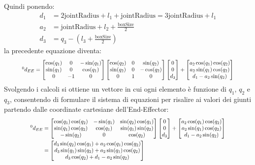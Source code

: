 \documentclass[11pt, a4paper]{report}
\begin{document}
Quindi ponendo:
\begin{align*}
    d_{1} &= 2\text{jointRadius} + l_{1} + \text{jointRadius} = 3\text{jointRadius} + l_{1} \\
    a_{2} &= \text{jointRadius} + l_{2} + \frac{\text{boxSize}}{2} \\
    d_{3} &= q_{3} - \left(l_{3} + \frac{\text{boxSize}}{2}\right)
\end{align*}
la precedente equazione diventa:
\[
\scalebox{0.8}{$
{}^{0}d_{EE} =
\begin{bmatrix}
    \cos(q_1) & 0 & -\sin(q_1) \\
    \sin(q_1) & 0 & \cos(q_1) \\
    0 & -1 & 0
\end{bmatrix}
\begin{bmatrix}
    \cos(q_2) & 0 & \sin(q_2) \\
    \sin(q_2) & 0 & -\cos(q_2) \\
    0 & 1 & 0
\end{bmatrix}
\begin{bmatrix}
    0\\
    0\\
    d_{3}
\end{bmatrix}
+
\begin{bmatrix}
   a_{2}\cos(q_1)\cos(q_2) \\
   a_{2}\sin(q_1)\cos(q_2) \\
    d_{1} - a_{2}\sin(q_2)
\end{bmatrix}
$}
\]
Svolgendo i calcoli si ottiene un vettore in cui ogni elemento è funzione di $q_1$, $q_2$ e $q_3$, consentendo di formulare il sistema di equazioni per risalire ai valori dei giunti partendo dalle coordinate cartesiane dell'End-Effector:
\[
\scalebox{0.8}{$
\begin{aligned}
    {}^{0}d_{EE} & =
    \begin{bmatrix}
        \cos(q_1)\cos(q_2) & -\sin(q_1) & \sin(q_2)\cos(q_1) \\
        \sin(q_1)\cos(q_2) & \cos(q_1) & \sin(q_1)\sin(q_2) \\
        -\sin(q_2) & 0 & \cos(q_2)
    \end{bmatrix}
    \begin{bmatrix}
        0\\
        0\\
        d_{3}
    \end{bmatrix}
    +
    \begin{bmatrix}
    a_{2}\cos(q_1)\cos(q_2) \\
    a_{2}\sin(q_1)\cos(q_2) \\
    d_{1} - a_{2}\sin(q_2)
    \end{bmatrix}\\
    &=
    \begin{bmatrix}
    d_3 \sin(q_2) \cos(q_1) + a_2 \cos(q_1) \cos(q_2)\\
    d_3 \sin(q_1) \sin(q_2) + a_2 \sin(q_1) \cos(q_2) \\
    d_3 \cos(q_2) + d_1 - a_2 \sin(q_2)
    \end{bmatrix}
\end{aligned}
$}
\]
\end{document}
